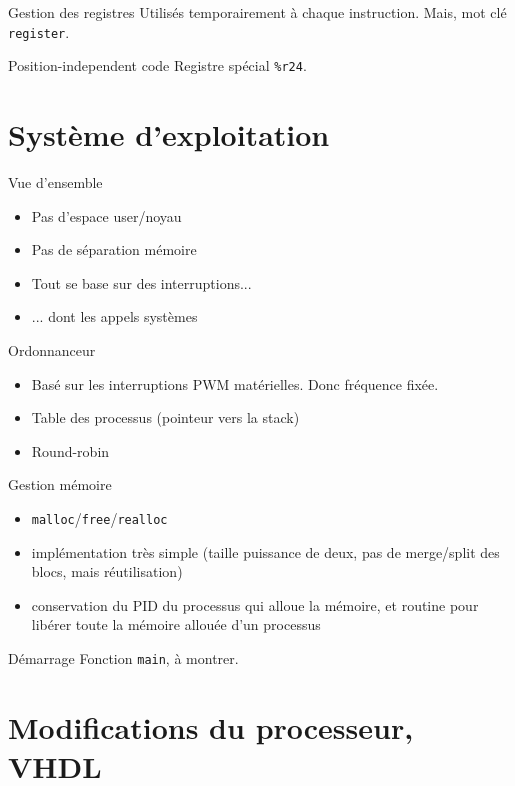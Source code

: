 \documentclass{beamer}
\begin{document}
    \begin{frame}[fragile]{Gestion des registres}
      Utilisés temporairement à chaque instruction. Mais, mot clé
      \verb+register+.
\end{frame}

    \begin{frame}[fragile]{Position-independent code}
      Registre spécial \verb+%r24+.
\end{frame}

  \section{Système d'exploitation}
    \begin{frame}[fragile]{Vue d'ensemble}
      \begin{itemize}
        \item Pas d'espace user/noyau
        \item Pas de séparation mémoire
        \item Tout se base sur des interruptions...
        \item ... dont les appels systèmes
      \end{itemize}
\end{frame}

    \begin{frame}[fragile]{Ordonnanceur}
      \begin{itemize}
        \item Basé sur les interruptions PWM matérielles. Donc fréquence fixée.
        \item Table des processus (pointeur vers la stack)
        \item Round-robin
      \end{itemize}
\end{frame}

    \begin{frame}[fragile]{Gestion mémoire}
      \begin{itemize}
        \item \verb+malloc+/\verb+free+/\verb+realloc+
        \item implémentation très simple (taille puissance de deux, pas de
          merge/split des blocs, mais réutilisation)
        \item conservation du PID du processus qui alloue la mémoire, et routine
          pour libérer toute la mémoire allouée d'un processus
      \end{itemize}
\end{frame}

    \begin{frame}[fragile]{Démarrage}
        Fonction \verb+main+, à montrer.
\end{frame}

  \section{Modifications du processeur, VHDL}
\end{document}
